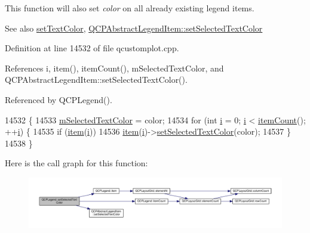 This function will also set {\itshape color} on all already existing legend items.

\begin{DoxySeeAlso}{See also}
\hyperlink{class_q_c_p_legend_ae1eb239ff4a4632fe1b6c3e668d845c6}{set\+Text\+Color}, \hyperlink{class_q_c_p_abstract_legend_item_a4d01d008ee1a5bfe9905b0397a421936}{Q\+C\+P\+Abstract\+Legend\+Item\+::set\+Selected\+Text\+Color} 
\end{DoxySeeAlso}


Definition at line 14532 of file qcustomplot.\+cpp.



References i, item(), item\+Count(), m\+Selected\+Text\+Color, and Q\+C\+P\+Abstract\+Legend\+Item\+::set\+Selected\+Text\+Color().



Referenced by Q\+C\+P\+Legend().


\begin{DoxyCode}
14532                                                         \{
14533   \hyperlink{class_q_c_p_legend_a6c25c8796c6e73e983aae6024965f2be}{mSelectedTextColor} = color;
14534   \textcolor{keywordflow}{for} (\textcolor{keywordtype}{int} \hyperlink{_comparision_pictures_2_createtest_image_8m_a6f6ccfcf58b31cb6412107d9d5281426}{i} = 0; \hyperlink{_comparision_pictures_2_createtest_image_8m_a6f6ccfcf58b31cb6412107d9d5281426}{i} < \hyperlink{class_q_c_p_legend_a198228e9cdc78d3a3c306fa6763d0404}{itemCount}(); ++\hyperlink{_comparision_pictures_2_createtest_image_8m_a6f6ccfcf58b31cb6412107d9d5281426}{i}) \{
14535     \textcolor{keywordflow}{if} (\hyperlink{class_q_c_p_legend_a454272d7094437beb3278a2294006da5}{item}(\hyperlink{_comparision_pictures_2_createtest_image_8m_a6f6ccfcf58b31cb6412107d9d5281426}{i}))
14536       \hyperlink{class_q_c_p_legend_a454272d7094437beb3278a2294006da5}{item}(\hyperlink{_comparision_pictures_2_createtest_image_8m_a6f6ccfcf58b31cb6412107d9d5281426}{i})->\hyperlink{class_q_c_p_abstract_legend_item_a4d01d008ee1a5bfe9905b0397a421936}{setSelectedTextColor}(color);
14537   \}
14538 \}
\end{DoxyCode}


Here is the call graph for this function\+:\nopagebreak
\begin{figure}[H]
\begin{center}
\leavevmode
\includegraphics[width=350pt]{class_q_c_p_legend_a7674dfc7a1f30e1abd1018c0ed45e0bc_cgraph}
\end{center}
\end{figure}




